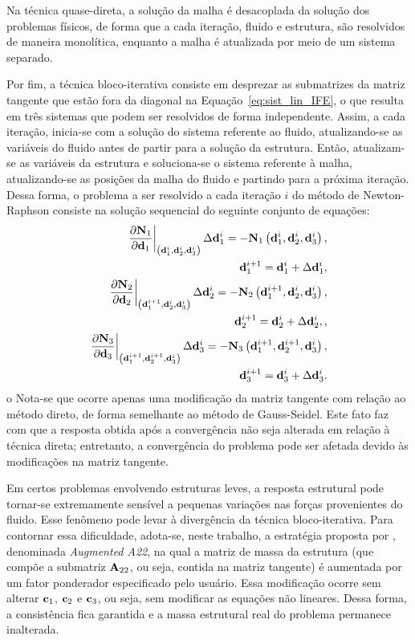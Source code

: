 Na técnica quase-direta, a solução da malha é desacoplada da solução dos problemas físicos, de forma que a cada iteração, fluido e estrutura, são resolvidos de maneira monolítica, enquanto a malha é atualizada por meio de um sistema separado.

Por fim, a técnica bloco-iterativa consiste em desprezar as submatrizes da matriz tangente que estão fora da diagonal na Equação~\eqref{eq:sist_lin_IFE}, o que resulta em três sistemas que podem ser resolvidos de forma independente. Assim, a cada iteração, inicia-se com a solução do sistema referente ao fluido, atualizando-se as variáveis do fluido antes de partir para a solução da estrutura. Então, atualizam-se as variáveis da estrutura e soluciona-se o sistema referente à malha, atualizando-se as posições da malha do fluido e partindo para a próxima iteração. Dessa forma, o problema a ser resolvido a cada iteração $i$ do método de Newton-Raphson consiste na solução sequencial do seguinte conjunto de equações:
\begin{align}
	\left .\frac{\partial\mathbf{N}_{1}}{\partial\mathbf{d}_{1}}\right|_{\left(\mathbf{d}_{1}^{i},\mathbf{d}_{2}^{i},\mathbf{d}_{3}^{i}\right)} \Delta\mathbf{d}_{1}^{i} = - \mathbf{N}_{1}\left(\mathbf{d}_{1}^{i},\mathbf{d}_{2}^{i},\mathbf{d}_{3}^{i}\right)  \label{eq:lin_fluido}, \\
	\mathbf{d}_{1}^{i+1} =  \mathbf{d}_{1}^{i} + \Delta\mathbf{d}_{1}^{i} \label{eq:atu_fluido},	\\
	\left.\frac{\partial\mathbf{N}_{2}}{\partial\mathbf{d}_{2}}\right|_{\left(\mathbf{d}_{1}^{i+1},\mathbf{d}_{2}^{i},\mathbf{d}_{3}^{i}\right)} \Delta\mathbf{d}_{2}^{i} = - \mathbf{N}_{2}\left(\mathbf{d}_{1}^{i+1},\mathbf{d}_{2}^{i},\mathbf{d}_{3}^{i}\right) \label{eq:lin_est},\\
	\mathbf{d}_{2}^{i+1} =  \mathbf{d}_{2}^{i} + \Delta\mathbf{d}_{2}^{i}, \label{eq:atu_est},\\
	\left.\frac{\partial\mathbf{N}_{3}}{\partial\mathbf{d}_{3}}\right|_{\left(\mathbf{d}_{1}^{i+1},\mathbf{d}_{2}^{i+1},\mathbf{d}_{3}^{i}\right)} \Delta\mathbf{d}_{3}^{i} = - \mathbf{N}_{3}\left(\mathbf{d}_{1}^{i+1},\mathbf{d}_{2}^{i+1},\mathbf{d}_{3}^{i}\right) \label{eq:lin_malha},\\
	\mathbf{d}_{3}^{i+1} =  \mathbf{d}_{3}^{i} + \Delta\mathbf{d}_{3}^{i}.  \label{eq:atu_malha}
\end{align}
o
Nota-se que ocorre apenas uma modificação da matriz tangente com relação ao método direto, de forma semelhante ao método de Gauss-Seidel. Este fato faz com que a resposta obtida após a convergência não seja alterada em relação à técnica direta; entretanto, a convergência do problema pode ser afetada devido às modificações na matriz tangente. 

Em certos problemas envolvendo estruturas leves, a resposta estrutural pode tornar-se extremamente sensível a pequenas variações nas forças provenientes do fluido. Esse fenômeno pode levar à divergência da técnica  bloco-iterativa. Para contornar essa dificuldade, adota-se, neste trabalho, a estratégia proposta por , denominada \textit{Augmented A22}, na qual a matriz de massa da estrutura (que compõe a submatriz $\mathbf{A}_{22}$, ou seja, contida na matriz tangente) é aumentada por um fator ponderador especificado pelo usuário. Essa modificação ocorre sem alterar $\mathbf{c}_{1}$, $\mathbf{c}_{2}$ e $\mathbf{c}_{3}$, ou seja, sem modificar as equações não lineares. Dessa forma, a consistência fica garantida e a massa estrutural real do problema permanece inalterada.

